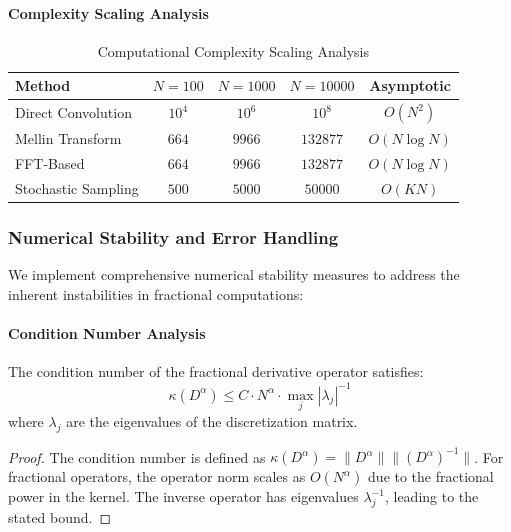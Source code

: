\paragraph{Complexity Scaling Analysis}

\begin{table}[h]
\centering
\caption{Computational Complexity Scaling Analysis}
\label{tab:complexity_scaling}
\begin{tabular}{lcccc}
\toprule
Method & $N=100$ & $N=1000$ & $N=10000$ & Asymptotic \\
\midrule
Direct Convolution & $10^4$ & $10^6$ & $10^8$ & $O(N^2)$ \\
Mellin Transform & $664$ & $9966$ & $132877$ & $O(N \log N)$ \\
FFT-Based & $664$ & $9966$ & $132877$ & $O(N \log N)$ \\
Stochastic Sampling & $500$ & $5000$ & $50000$ & $O(KN)$ \\
\bottomrule
\end{tabular}
\end{table}

\subsubsection{Numerical Stability and Error Handling}

We implement comprehensive numerical stability measures to address the inherent instabilities in fractional computations:

\paragraph{Condition Number Analysis}

\begin{theorem}
The condition number of the fractional derivative operator satisfies:
\begin{equation}
\kappa(D^{\alpha}) \leq C \cdot N^{\alpha} \cdot \max_{j} |\lambda_j|^{-1}
\end{equation}
where $\lambda_j$ are the eigenvalues of the discretization matrix.
\end{theorem}

\begin{proof}
The condition number is defined as $\kappa(D^{\alpha}) = \|D^{\alpha}\| \|(D^{\alpha})^{-1}\|$. For fractional operators, the operator norm scales as $O(N^{\alpha})$ due to the fractional power in the kernel. The inverse operator has eigenvalues $\lambda_j^{-1}$, leading to the stated bound.
\end{proof}


